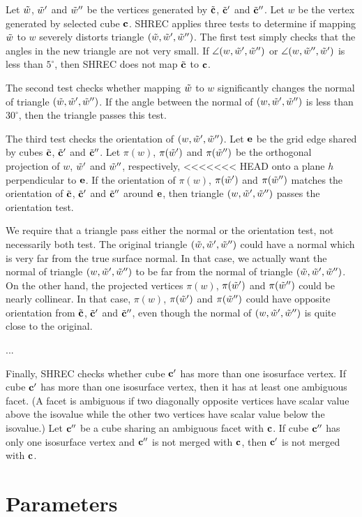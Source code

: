 Let $\tilde{w}$, $\tilde{w}'$ and $\tilde{w}''$ be the vertices generated
by ${\tilde{\mathbf{c}}}$, ${\tilde{\mathbf{c}}}'$ and ${\tilde{\mathbf{c}}}''$.
Let $w$ be the vertex generated by selected cube $\mathbf{c}$.
SHREC applies three tests to determine if mapping $\tilde{w}$ to $w$
severely distorts triangle $(\tilde{w},\tilde{w}',\tilde{w}'')$.
The first test simply checks that the angles in the new triangle
are not very small.
If $\angle(w,\tilde{w}',\tilde{w}'')$ or $\angle(w,\tilde{w}'',\tilde{w}')$ is less than $5^\circ$,
then SHREC does not map ${\tilde{\mathbf{c}}}$ to $\mathbf{c}$.

The second test checks whether mapping $\tilde{w}$ to $w$
significantly changes the normal of triangle $(\tilde{w},\tilde{w}',\tilde{w}'')$.
If the angle between the normal of $(w, \tilde{w}', \tilde{w}'')$ is less than $30^\circ$,
then the triangle passes this test.

The third test checks the orientation of $(w, \tilde{w}', \tilde{w}'')$.
Let $\mathbf{e}$ be the grid edge shared by cubes ${\tilde{\mathbf{c}}}$, ${\tilde{\mathbf{c}}}'$ and ${\tilde{\mathbf{c}}}''$.
Let $\pi(w)$, $\pi(\tilde{w}')$ and $\pi(\tilde{w}'')$ be the orthogonal projection
of $w$, $\tilde{w}'$ and $\tilde{w}''$, respectively, 
<<<<<<< HEAD
onto a plane $h$ perpendicular to $\mathbf{e}$.
If the orientation of $\pi(w)$, $\pi(\tilde{w}')$ and $\pi(\tilde{w}'')$
matches the orientation of ${\tilde{\mathbf{c}}}$, ${\tilde{\mathbf{c}}}'$ and ${\tilde{\mathbf{c}}}''$ around $\mathbf{e}$,
then triangle $(w,\tilde{w}',\tilde{w}'')$ passes the orientation test.

We require that a triangle pass either the normal or the orientation test,
not necessarily both test.
The original triangle $(\tilde{w},\tilde{w}',\tilde{w}'')$ could have a normal which
is very far from the true surface normal.
In that case, we actually want the normal of triangle $(w, \tilde{w}', \tilde{w}'')$
to be far from the normal of triangle $(\tilde{w}, \tilde{w}', \tilde{w}'')$.
On the other hand,
the projected vertices $\pi(w)$, $\pi(\tilde{w}')$ and $\pi(\tilde{w}'')$
could be nearly collinear.
In that case, $\pi(w)$, $\pi(\tilde{w}')$ and $\pi(\tilde{w}'')$ could have
opposite orientation from ${\tilde{\mathbf{c}}}$, ${\tilde{\mathbf{c}}}'$ and ${\tilde{\mathbf{c}}}''$,
even though the normal of $(w,\tilde{w}',\tilde{w}'')$ is quite close
to the original.


...






Finally, SHREC checks whether cube $\mathbf{c}'$ has more than one isosurface vertex.
If cube $\mathbf{c}'$ has more than one isosurface vertex,
then it has at least one ambiguous facet.
(A facet is ambiguous if two diagonally opposite vertices have
scalar value above the isovalue while the other two vertices
have scalar value below the isovalue.)
Let $\mathbf{c}''$ be a cube sharing an ambiguous facet with $\mathbf{c}$.
If cube $\mathbf{c}''$ has only one isosurface vertex and 
$\mathbf{c}''$ is not merged with $\mathbf{c}$, then $\mathbf{c}'$ is not merged with $\mathbf{c}$.




\section{Parameters}
\label{section:parameters}

